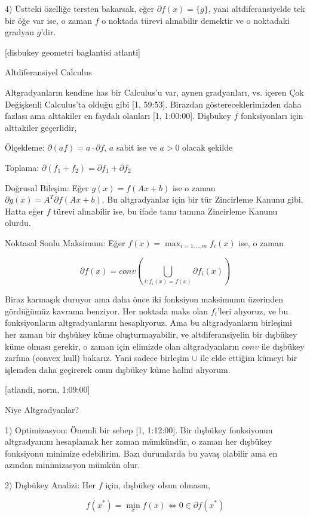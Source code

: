 \documentclass[12pt,fleqn]{article}\usepackage{../../common}
\begin{document}
4) Üstteki özelliğe tersten bakarsak, eğer $\partial f(x) = \{ g \}$, yani
altdiferansiyelde tek bir öğe var ise, o zaman $f$ o noktada türevi
alınabilir demektir ve o noktadaki gradyan $g$'dir. 

[disbukey geometri baglantisi atlanti]

Altdiferansiyel Calculus

Altgradyanların kendine has bir Calculus'u var, aynen gradyanları,
vs. içeren Çok Değişkenli Calculus'ta olduğu gibi [1, 59:53]. Birazdan
göstereceklerimizden daha fazlası ama alttakiler en faydalı olanları [1,
1:00:00]. Dişbukey $f$ fonksiyonları için alttakiler geçerlidir,

Ölçekleme: $\partial (af) = a \cdot \partial f$, $a$ sabit ise ve $a > 0$
olacak şekilde

Toplama: $\partial (f_1 + f_2) = \partial f_1 + \partial f_2$

Doğrusal Bileşim: Eğer $g(x) = f(Ax + b)$ ise o zaman
$\partial g(x) = A^T \partial f(Ax + b)$. Bu altgradyanlar için bir tür
Zincirleme Kanunu gibi. Hatta eğer $f$ türevi alınabilir ise, bu ifade tamı
tamına Zincirleme Kanunu olurdu. 

Noktasal Sonlu Maksimum: Eğer $f(x) = \max_{i=1,..,m} f_i(x)$ ise, o zaman 

$$
\partial f(x) = conv \left( 
\bigcup_{i: f_i(x)=f(x)} \partial f_i(x)
\right)
$$

Biraz karmaşık duruyor ama daha önce iki fonksiyon maksimumu üzerinden
gördüğümüz kavrama benziyor. Her noktada maks olan $f_i$'leri alıyoruz, ve
bu fonksiyonların altgradyanlarını hesaplıyoruz. Ama bu altgradyanların
birleşimi her zaman bir dışbükey küme oluşturmayabilir, ve
altdiferansiyelin bir dışbükey küme olması gerekir, o zaman için elimizde
olan altgradyanların $conv$ ile dışbükey zarfına (convex hull)
bakarız. Yani sadece birleşim $\cup$ ile elde ettiğim kümeyi bir işlemden
daha geçirerek onun dışbükey küme halini alıyorum.

[atlandi, norm, 1:09:00]

Niye Altgradyanlar? 

1) Optimizasyon: Önemli bir sebep [1, 1:12:00]. Bir dışbükey fonksiyonun
altgradyanını hesaplamak her zaman mümkündür, o zaman her dışbükey
fonksiyonu minimize edebilirim. Bazı durumlarda bu yavaş olabilir ama en
azından minimizasyon mümkün olur.

2) Dışbükey Analizi: Her $f$ için, dışbükey olsun olmasın, 

$$
f(x^\ast) = \min_x f(x) \iff 0 \in \partial f(x^\ast)
$$
\end{document}
